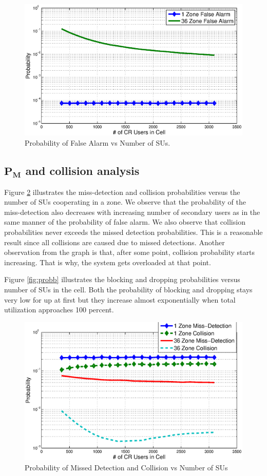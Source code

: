 \documentclass[conference,compsoc]{IEEEtran}
\newcommand{\probm}{\mathbf{P_M}}
\begin{document}
\begin{figure}[t]
\centering
\includegraphics[width=0.99\columnwidth,keepaspectratio] {figs/pf.eps}
\caption{Probability of False Alarm vs Number of SUs.}
\label{fig:probf}
\end{figure}

\subsection{$\probm$ and collision analysis}
Figure \ref{fig:probm} illustrates the miss-detection and collision probabilities versus the number of SUs cooperating in a zone. We observe that the probability of the miss-detection also decreases with increasing number of secondary users as in the same manner of the probability of false alarm. We also observe that collision probabilities never exceeds the missed detection probabilities. This is a reasonable result since all collisions are caused due to missed detections. Another observation from the graph is that, after some point, collision probability starts increasing. That is why, the system gets overloaded at that point.

Figure \ref{fig:probb} illustrates the blocking and dropping probabilities versus number of SUs in the cell. Both the probability of blocking and dropping stays very low for up at first but they increase almost exponentially when total utilization approaches 100 percent.

\begin{figure}[t]
\centering
\includegraphics[width=0.99\columnwidth,keepaspectratio] {figs/pm_c.eps}
\caption{Probability of Missed Detection and Collision vs Number of
SUs} \label{fig:probm}
\end{figure}
\end{document}

